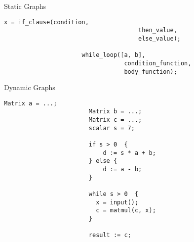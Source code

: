 \begin{frame}[fragile]{Static Graphs}
      \begin{lstlisting}[language=pseudoML]
                      x = if_clause(condition,
                                      then_value,
                                      else_value);

                      while_loop([a, b],
                                  condition_function,
                                  body_function);
      \end{lstlisting}
\end{frame}


\begin{frame}[fragile]{Dynamic Graphs}
      \begin{lstlisting}[language=pseudoML]
                        Matrix a = ...;
                        Matrix b = ...;
                        Matrix c = ...;
                        scalar s = 7;

                        if s > 0  {
                            d := s * a + b;
                        } else {
                            d := a - b;
                        }

                        while s > 0  {
                          x = input();
                          c = matmul(c, x);
                        }

                        result := c;
      \end{lstlisting}
\end{frame}
